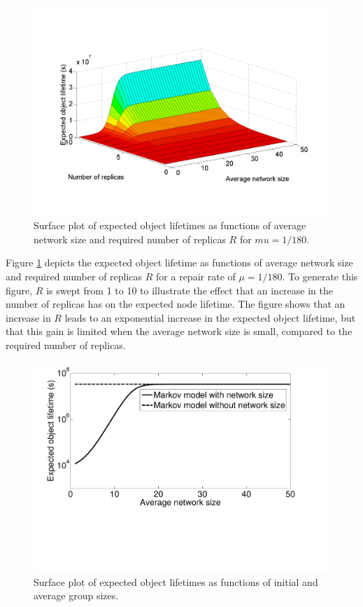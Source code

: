\documentclass[10pt,a4paper,conference]{IEEEtran}
\begin{document}
\begin{figure}[htbp]
 \centering
 \includegraphics[clip=true, viewport=2.5cm 1.0cm 27.5cm 19.15cm, width=0.8\columnwidth]{lifetime_replicas_av_groupsize}
 \caption{Surface plot of expected object lifetimes as functions of average network size and required number of replicas $R$ for $mu = 1/180$.}
 \label{fig_lifetime_average_vs_replicas}
\end{figure}
%
Figure \ref{fig_lifetime_average_vs_replicas} depicts the expected object lifetime as functions of average network size and required number of replicas $R$ for a repair rate of $\mu = 1/180$. To generate this figure, $R$ is swept from 1 to 10 to illustrate the effect that an increase in the number of replicas has on the expected node lifetime. The figure shows that an increase in $R$ leads to an exponential increase in the expected object lifetime, but that this gain is limited when the average network size is small, compared to the required number of replicas.

\begin{figure}[htbp]
 \centering
 \includegraphics[clip=true, viewport=1.0cm 6.5cm 26.5cm 20.5cm, width=0.8\columnwidth]{lifetime_av_models_compare}
 \caption{Surface plot of expected object lifetimes as functions of initial and average group sizes.}
 \label{fig_lifetime_vs_other_model}
\end{figure}
\end{document}

